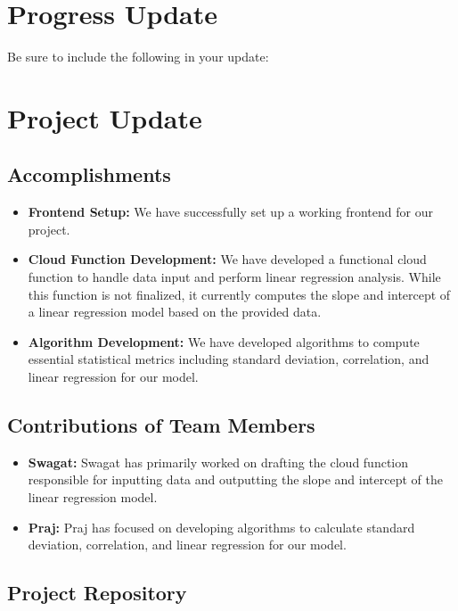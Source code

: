 \documentclass[conference]{IEEEtran}
\begin{document}
\section{Progress Update}

Be sure to include the following in your update:
\section*{Project Update}

\subsection*{Accomplishments}

\begin{itemize}
    \item \textbf{Frontend Setup:} We have successfully set up a working frontend for our project.
    
    \item \textbf{Cloud Function Development:} We have developed a functional cloud function to handle data input and perform linear regression analysis. While this function is not finalized, it currently computes the slope and intercept of a linear regression model based on the provided data. 
    
    \item \textbf{Algorithm Development:} We have developed algorithms to compute essential statistical metrics including standard deviation, correlation, and linear regression for our model.
\end{itemize}

\subsection*{Contributions of Team Members}

\begin{itemize}
    \item \textbf{Swagat:} Swagat has primarily worked on drafting the cloud function responsible for inputting data and outputting the slope and intercept of the linear regression model.
    
    \item \textbf{Praj:} Praj has focused on developing algorithms to calculate standard deviation, correlation, and linear regression for our model.
\end{itemize}

\subsection*{Project Repository}
\end{document}
